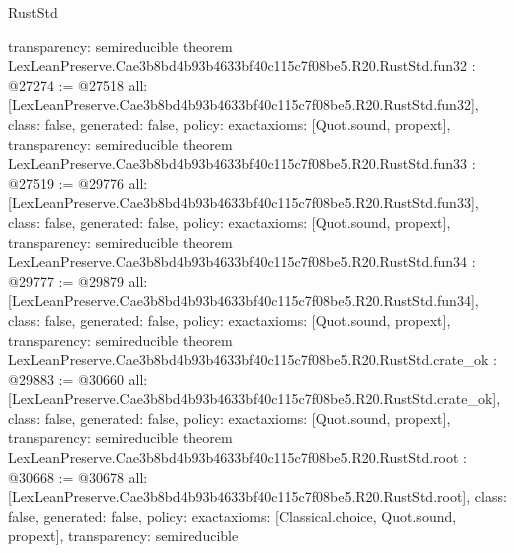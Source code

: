 \begin{lexlean}{RustStd}
\begin{coremodule}
{  transparency: semireducible
}
theorem LexLeanPreserve.Cae3b8bd4b93b4633bf40c115c7f08be5.R20.RustStd.fun32 : @27274 := @27518 {
  all: [LexLeanPreserve.Cae3b8bd4b93b4633bf40c115c7f08be5.R20.RustStd.fun32],
  class: false,
  generated: false,
  policy: exact{axioms: [Quot.sound, propext]},
  transparency: semireducible
}
theorem LexLeanPreserve.Cae3b8bd4b93b4633bf40c115c7f08be5.R20.RustStd.fun33 : @27519 := @29776 {
  all: [LexLeanPreserve.Cae3b8bd4b93b4633bf40c115c7f08be5.R20.RustStd.fun33],
  class: false,
  generated: false,
  policy: exact{axioms: [Quot.sound, propext]},
  transparency: semireducible
}
theorem LexLeanPreserve.Cae3b8bd4b93b4633bf40c115c7f08be5.R20.RustStd.fun34 : @29777 := @29879 {
  all: [LexLeanPreserve.Cae3b8bd4b93b4633bf40c115c7f08be5.R20.RustStd.fun34],
  class: false,
  generated: false,
  policy: exact{axioms: [Quot.sound, propext]},
  transparency: semireducible
}
theorem LexLeanPreserve.Cae3b8bd4b93b4633bf40c115c7f08be5.R20.RustStd.crate_ok : @29883 := @30660 {
  all: [LexLeanPreserve.Cae3b8bd4b93b4633bf40c115c7f08be5.R20.RustStd.crate_ok],
  class: false,
  generated: false,
  policy: exact{axioms: [Quot.sound, propext]},
  transparency: semireducible
}
theorem LexLeanPreserve.Cae3b8bd4b93b4633bf40c115c7f08be5.R20.RustStd.root : @30668 := @30678 {
  all: [LexLeanPreserve.Cae3b8bd4b93b4633bf40c115c7f08be5.R20.RustStd.root],
  class: false,
  generated: false,
  policy: exact{axioms: [Classical.choice, Quot.sound, propext]},
  transparency: semireducible
}


\end{coremodule}
\end{lexlean}
